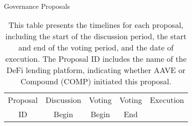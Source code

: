 \clearpage
\newpage
\begin{landscape}
    

\begin{table}[htbp]

  \caption{Governance Proposals}\label{tab:proposals}
  
\caption*{This table presents the timelines for each proposal, including the start of the discussion period, the start and end of the voting period, and the date of execution. The Proposal ID includes the name of the DeFi lending platform, indicating whether AAVE or Compound (COMP) initiated this proposal. }

\def\sym#1{\ifmmode^{#1}\else\(^{#1}\)\fi}


   \begin{tabular*}{\linewidth}{@{\extracolsep{\fill}}ccccc}
    \toprule
    Proposal & Discussion & Voting & Voting & Execution \\
      ID        &   Begin    & Begin & End &  \\
    \midrule

\end{tabular*}
\end{table}
\end{landscape}
